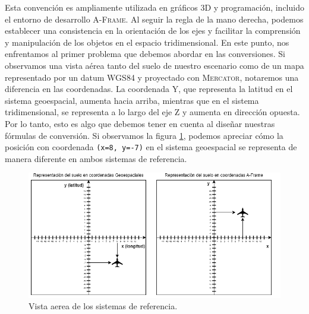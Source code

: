 \documentclass[a4paper, 11pt]{book}
\begin{document}
Esta convención es ampliamente utilizada en gráficos \textsc{3D} y programación, incluido el entorno de desarrollo \textsc{A-Frame}. Al seguir la regla de la mano derecha, podemos establecer una consistencia en la orientación de los ejes y facilitar la comprensión y manipulación de los objetos en el espacio tridimensional.
En este punto, nos enfrentamos al primer problema que debemos abordar en las conversiones. Si observamos una vista aérea tanto del suelo de nuestro escenario como de un mapa representado por un datum \textsc{WGS84} y proyectado con \textsc{Mercator}, notaremos una diferencia en las coordenadas.
La coordenada \textsc{Y}, que representa la latitud en el sistema \gls{geoespacial}, aumenta hacia arriba, mientras que en el sistema tridimensional, se representa a lo largo del eje \textsc{Z} y aumenta en dirección opuesta. Por lo tanto, esto es algo que debemos tener en cuenta al diseñar nuestras fórmulas de conversión.
Si observamos la figura \ref{fig:sistemasDeReferencia}, podemos apreciar cómo la posición con coordenada \texttt{(x=8, y=-7)} en el sistema \gls{geoespacial} se representa de manera diferente en ambos sistemas de referencia.
\begin{figure}[H]
  \centering
  \includegraphics[width=13cm, keepaspectratio]{img/sistemasDeReferencia.drawio.png}
  \caption{Vista aerea de los sistemas de referencia.}
  \label{fig:sistemasDeReferencia}
\end{figure}
\end{document}
